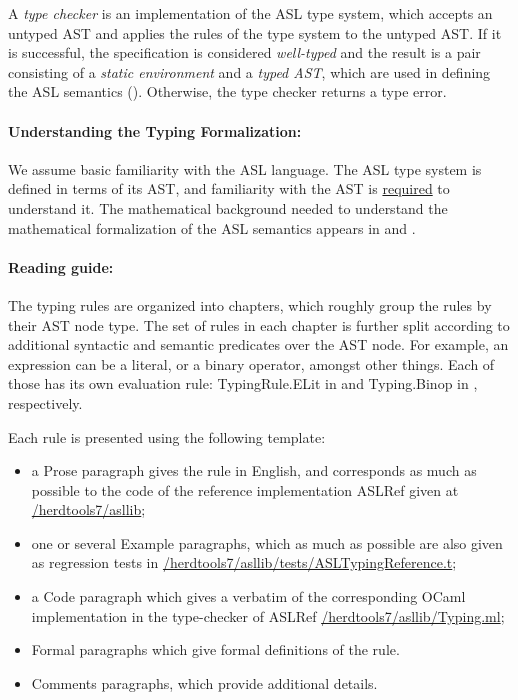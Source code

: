 A \emph{type checker} is an implementation of the ASL type system, which accepts an untyped AST and applies the
rules of the type system to the untyped AST. If it is successful, the specification
is considered \emph{well-typed} and the result is a pair consisting of
a \emph{static environment} and a \emph{typed AST}, which are used in defining the ASL semantics ().
Otherwise, the type checker returns a type error.

\paragraph{Understanding the Typing Formalization:}
We assume basic familiarity with the ASL language.
The ASL type system is defined in terms of its AST,
and familiarity with the AST is \underline{required} to understand it.
The mathematical background needed to understand the mathematical formalization
of the ASL semantics appears in  and .

\paragraph{Reading guide:}
The typing rules are organized into chapters, which roughly group the rules by their AST node type.
The set of rules in each chapter is further split according to additional syntactic and semantic
predicates over the AST node.
For example, an expression can be a literal, or a binary operator, amongst other
things. Each of those has its own evaluation rule: TypingRule.ELit in
 and
Typing.Binop in , respectively.

Each rule is presented using the following template:
\begin{itemize}
\item a Prose paragraph gives the rule in English, and corresponds as much as possible to the code of the reference implementation ASLRef given at
\href{https://github.com/herd/herdtools7//tree/master/asllib}{/herdtools7/asllib};
\item one or several Example paragraphs, which as much as possible are also given as regression tests in
\href{https://github.com/herd/herdtools7//tree/master/asllib/tests/ASLTypingReference.t}{/herdtools7/asllib/tests/ASLTypingReference.t};
\ifcode
\item a Code paragraph which gives a verbatim of the corresponding OCaml implementation in the type-checker of ASLRef
\href{https://github.com/herd/herdtools7//tree/master/asllib/Typing.ml}{/herdtools7/asllib/Typing.ml};
\fi
\item Formal paragraphs which give formal definitions of the rule.
\item Comments paragraphs, which provide additional details.
\end{itemize}

